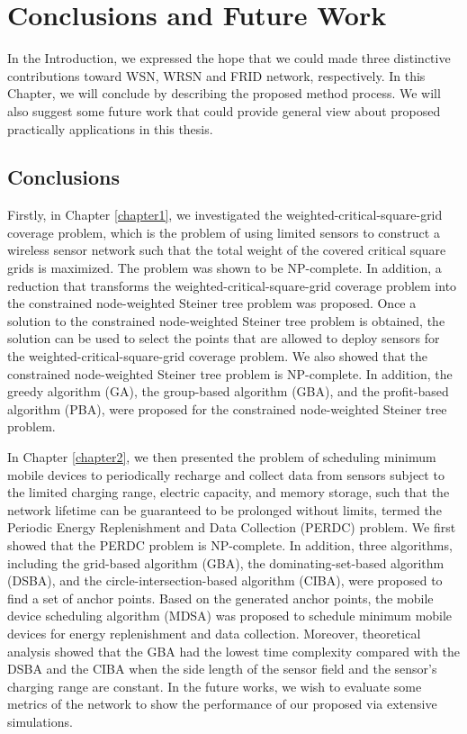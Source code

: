
\chapter{Conclusions and Future Work} \label{conclusion_and_future}
In the Introduction, we expressed the hope that we could made three distinctive contributions toward WSN, WRSN and FRID network, respectively. In this Chapter, we will conclude by describing the proposed method process.
We will also suggest some future work that could provide general view about proposed practically applications
in this thesis.   

\section{Conclusions}

Firstly, in Chapter \ref{chapter1}, we investigated the weighted-critical-square-grid
coverage problem, which is the problem of using limited sensors to
construct a wireless sensor network such that the total weight of
the covered critical square grids is maximized. The problem was
shown to be NP-complete. In addition, a reduction that transforms
the weighted-critical-square-grid coverage problem into the
constrained node-weighted Steiner tree problem was proposed. Once a
solution to the constrained node-weighted Steiner tree problem is
obtained, the solution can be used to select the points that are
allowed to deploy sensors for the weighted-critical-square-grid
coverage problem. We also showed that the constrained node-weighted
Steiner tree problem is NP-complete. In addition, the greedy
algorithm (GA), the group-based algorithm (GBA), and the
profit-based algorithm (PBA), were proposed for the constrained
node-weighted Steiner tree problem.

In Chapter \ref{chapter2}, we then presented the problem of scheduling minimum mobile
devices to periodically recharge and collect data from sensors
subject to the limited charging range, electric capacity, and memory
storage, such that the network lifetime can be guaranteed to be
prolonged without limits, termed the Periodic Energy Replenishment
and Data Collection (PERDC) problem. We first showed
that the PERDC problem is NP-complete. In addition, three
algorithms, including the grid-based algorithm (GBA), the
dominating-set-based algorithm (DSBA), and the
circle-intersection-based algorithm (CIBA), were proposed to find a
set of anchor points. Based on the generated anchor points, the
mobile device scheduling algorithm (MDSA) was proposed to schedule
minimum mobile devices for energy replenishment and data collection.
Moreover, theoretical analysis showed that the GBA had the lowest
time complexity compared with the DSBA and the CIBA when the side
length of the sensor field and the sensor's charging range are
constant. In the future works, we wish to evaluate some metrics
of the network to show the performance of our proposed via extensive simulations.

